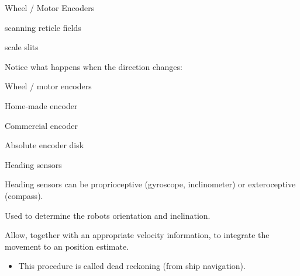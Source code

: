 \documentclass[compress]{beamer}
\providecommand{\tightlist}{%
  \setlength{\itemsep}{0pt}\setlength{\parskip}{0pt}}
\begin{document}
\begin{frame}{Wheel / Motor Encoders}

scanning reticle fields

scale slits

Notice what happens when the direction changes:

\end{frame}

\begin{frame}{Wheel / motor encoders}

Home-made encoder

Commercial encoder

Absolute encoder disk

\end{frame}

\begin{frame}{Heading sensors}

Heading sensors can be proprioceptive (gyroscope, inclinometer) or
exteroceptive (compass).

Used to determine the robots orientation and inclination.

Allow, together with an appropriate velocity information, to integrate
the movement to an position estimate.

\begin{itemize}
\tightlist
\item
  This procedure is called dead reckoning (from ship navigation).
\end{itemize}

\end{frame}
\end{document}
